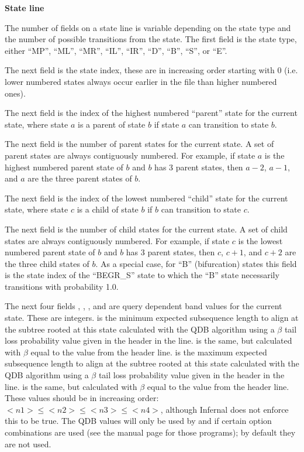 \begin{sreitems}{\textbf{State line}}
\item [\textbf{State line}] 
  The number of fields on a state line is variable depending on the
  state type and the number of possible transitions from the
  state. The first field is the state type, either ``MP'', ``ML'',
  ``MR'', ``IL'', ``IR'', ``D'', ``B'', ``S'', or ``E''.

  The next field is the state index, these are in increasing order
  starting with 0 (i.e. lower numbered states always occur earlier in the
  file than higher numbered ones). 

  The next field is the index of the highest numbered ``parent''
  state for the current state, where state $a$ is a parent of state
  $b$ if state $a$ can transition to state $b$.

  The next field is the number of parent states for the current
  state. A set of parent states are always contiguously numbered. For
  example, if state $a$ is the highest numbered parent state of $b$
  and $b$ has 3 parent states, then $a-2$, $a-1$, and $a$ are the
  three parent states of $b$.

  The next field is the index of the lowest numbered ``child'' state
  for the current state, where state $c$ is a child of state $b$ if
  $b$ can transition to state $c$. 

  The next field is the number of child states for the current
  state. A set of child states are always contiguously numbered. For
  example, if state $c$ is the lowest numbered parent state of $b$ and
  $b$ has 3 parent states, then $c$, $c+1$, and $c+2$ are the three
  child states of $b$. As a special case, for ``B'' (bifurcation) states
  this field is the state index of the ``BEGR\_S'' state to which the
  ``B'' state necessarily transitions with probability 1.0.

  The next four fields , , , and
   are query dependent band values for the current
  state. These are integers.  is the minimum expected
  subsequence length to align at the subtree rooted at this state
  calculated with the QDB algorithm \citep{NawrockiEddy07} using a
  $\beta$ tail loss probability value given in the header in the
   line.  is the same, but calculated with
  $\beta$ equal to the value from the  header line. 
   is the maximum expected
  subsequence length to align at the subtree rooted at this state
  calculated with the QDB algorithm \citep{NawrockiEddy07} using a
  $\beta$ tail loss probability value given in the header in the
   line.  is the same, but calculated with
  $\beta$ equal to the value from the  header line. 
  These values should be in increasing order: $<n1> \leq <n2> \leq
  <n3> \leq <n4>$, although Infernal does not enforce this to be
  true. The QDB values will only be used by  and
   if certain option combinations are used (see the
  manual page for those programs); by default they are not used.


\end{sreitems}
